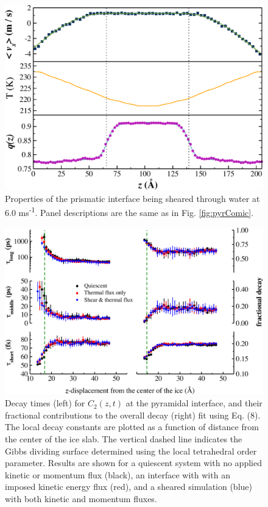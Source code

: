 \begin{figure}
\includegraphics[width=\linewidth]{Figures/Pri_comic_strip}
\caption{\label{fig:pComic} Properties of the prismatic interface
  being sheared through water at 6.0 ms\textsuperscript{-1}.  Panel
  descriptions are the same as in Fig. \ref{fig:pyrComic}.}
\end{figure}


\begin{figure}
\includegraphics[width=\linewidth]{Figures/Pyr_lcorrz}
\caption{\label{fig:Pyrorient} Decay times (left) for $C_2(z,t)$ at
  the pyramidal interface, and their fractional contributions to the
  overall decay (right) fit using Eq. (8). The local decay constants
  are plotted as a function of distance from the center of the ice
  slab. The vertical dashed line indicates the Gibbs dividing surface
  determined using the local tetrahedral order parameter.  Results are
  shown for a quiescent system with no applied kinetic or momentum
  flux (black), an interface with with an imposed kinetic energy flux
  (red), and a sheared simulation (blue) with both kinetic and
  momentum fluxes.}
\end{figure}

